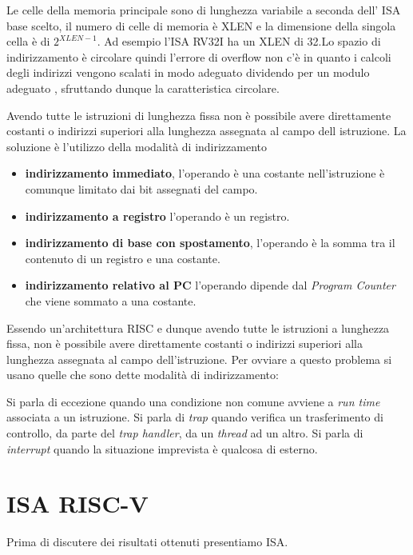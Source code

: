 \documentclass[12pt,a4paper]{report}
\begin{document}
Le celle della memoria principale sono di lunghezza variabile a seconda dell' ISA base scelto, il numero di celle di memoria è XLEN e la dimensione della singola cella è di $2^{XLEN - 1}$. Ad esempio l'ISA RV32I ha un XLEN di 32.Lo spazio di indirizzamento è circolare quindi l'errore di overflow non c'è in quanto i calcoli degli indirizzi vengono scalati in modo adeguato dividendo per un modulo adeguato , sfruttando dunque la caratteristica circolare.



Avendo tutte le istruzioni di lunghezza fissa non è possibile avere direttamente costanti o indirizzi superiori alla lunghezza assegnata al campo dell istruzione. La soluzione è l'utilizzo della modalità di indirizzamento
\begin{itemize}
	\item \textbf{indirizzamento immediato}, l’operando è una costante nell’istruzione è comunque limitato dai bit assegnati del campo.
	\item \textbf{indirizzamento a registro} l’operando è un registro.
	\item \textbf{indirizzamento di base con spostamento}, l’operando è la somma tra il
contenuto di un registro e una costante.
\item \textbf{indirizzamento relativo al PC} l'operando dipende dal \textit{Program Counter} che viene sommato a una costante.
\end{itemize}

Essendo un’architettura RISC e dunque avendo tutte le istruzioni a lunghezza fissa, non è possibile avere direttamente costanti o indirizzi superiori alla lunghezza assegnata al campo dell’istruzione. Per ovviare a questo problema si usano quelle che sono dette modalità di indirizzamento:

Si parla di eccezione quando una condizione non comune avviene a \textit{run time} associata a un istruzione.
Si parla di \textit{trap} quando verifica un trasferimento di controllo, da parte del \textit{trap handler}, da un  \textit{thread} ad un altro. Si parla di \textit{interrupt} quando la situazione imprevista è qualcosa di esterno.


% 
\chapter{ISA RISC-V}
Prima di discutere dei risultati ottenuti presentiamo ISA.
\end{document}
